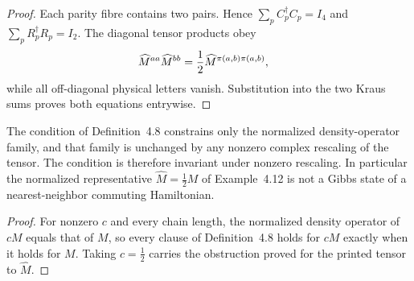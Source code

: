 \begin{proof}\leanok
    Each parity fibre contains two pairs. Hence
    $\sum_p C_p^\dagger C_p=I_4$ and
    $\sum_p R_p^\dagger R_p=I_2$. The diagonal tensor products obey
    \begin{align}
        \widehat M^{aa}\widehat M^{bb}
         & =\frac12\widehat M^{\pi(a,b)\pi(a,b)},
        \notag
    \end{align}
    while all off-diagonal physical letters vanish. Substitution into the two
    Kraus sums proves both equations entrywise.
\end{proof}

\begin{lemma}
    \label{thm:cpsv_example412_normalized_not_gsnnch}
    \leanok
    The condition of Definition~4.8 constrains only the normalized
    density-operator family, and that family is unchanged by any nonzero
    complex rescaling of the tensor. The condition is therefore invariant
    under nonzero rescaling. In particular the normalized representative
    $\widehat M=\frac12 M$ of Example~4.12 is not a Gibbs state of a
    nearest-neighbor commuting Hamiltonian.
\end{lemma}
\begin{proof}\leanok
    For nonzero $c$ and every chain length, the normalized density operator
    of $cM$ equals that of $M$, so every clause of Definition~4.8 holds for
    $cM$ exactly when it holds for $M$. Taking $c=\frac12$ carries the
    obstruction proved for the printed tensor to $\widehat M$.
\end{proof}

